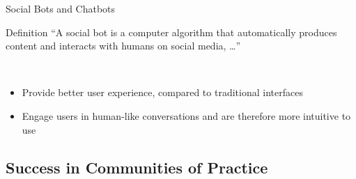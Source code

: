\begin{frame}{Social Bots and Chatbots}
  \begin{block}{Definition}
    ``A social bot is a computer algorithm that automatically produces content and interacts with humans on social media, \dots'' \cite{FVD*16b}
  \end{block}
  \ \\
  \begin{itemize}
    \item Provide better user experience, compared to traditional interfaces
    \item Engage users in human-like conversations and are therefore more intuitive to use 
\end{itemize}
\end{frame}


\subsection{Success in Communities of Practice}


